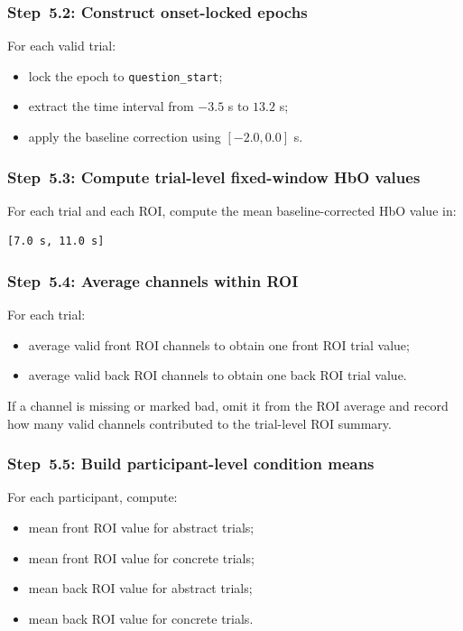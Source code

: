 \documentclass[11pt]{article}
\begin{document}
\subsubsection{Step~5.2: Construct onset-locked epochs}
For each valid trial:
\begin{itemize}
    \item lock the epoch to \texttt{question\_start};
    \item extract the time interval from \(-3.5\) s to \(13.2\) s;
    \item apply the baseline correction using \([-2.0, 0.0]\) s.
\end{itemize}

\subsubsection{Step~5.3: Compute trial-level fixed-window HbO values}
For each trial and each ROI, compute the mean baseline-corrected HbO value in:
\begin{verbatim}
[7.0 s, 11.0 s]
\end{verbatim}

\subsubsection{Step~5.4: Average channels within ROI}
For each trial:
\begin{itemize}
    \item average valid front ROI channels to obtain one front ROI trial value;
    \item average valid back ROI channels to obtain one back ROI trial value.
\end{itemize}

If a channel is missing or marked bad, omit it from the ROI average and record how many valid channels
contributed to the trial-level ROI summary.

\subsubsection{Step~5.5: Build participant-level condition means}
For each participant, compute:
\begin{itemize}
    \item mean front ROI value for abstract trials;
    \item mean front ROI value for concrete trials;
    \item mean back ROI value for abstract trials;
    \item mean back ROI value for concrete trials.
\end{itemize}
\end{document}
